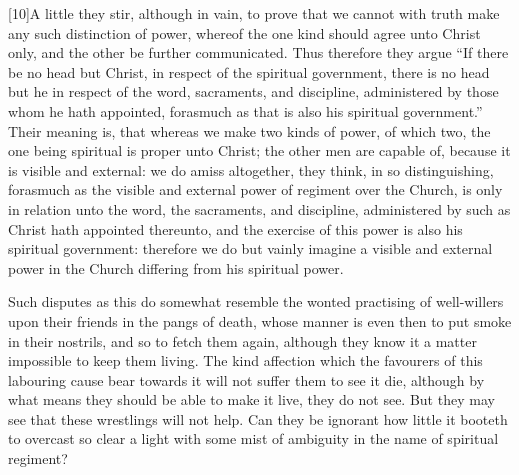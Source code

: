 [10]A little they stir, although in vain, to prove that we cannot with truth make any such distinction of power, whereof the one kind should agree unto Christ only, and the other be further communicated. Thus therefore they argue “If there be no head but Christ, in respect of the spiritual government, there is no head but he in respect of the word, sacraments, and discipline, administered by those whom he hath appointed, forasmuch as that is also his spiritual government.” Their meaning is, that whereas we make two kinds of power, of which two, the one being spiritual is proper unto Christ; the other men are capable of, because it is visible and external: we do amiss altogether, they think, in so distinguishing, forasmuch as the visible and external power of regiment over the Church, is only in relation unto the word, the sacraments, and discipline, administered by such as Christ hath appointed thereunto, and the exercise of this power is also his spiritual government: therefore we do but vainly imagine a visible and external power in the Church differing from his spiritual power.

Such disputes as this do somewhat resemble the wonted practising of well-willers upon their friends in the pangs of death, whose manner is even then to put smoke in their nostrils, and so to fetch them again, although they know it a matter impossible to keep them living. The kind affection which the favourers of this labouring cause bear towards it will  not suffer them to see it die, although by what means they should be able to make it live, they do not see. But they may see that these wrestlings will not help. Can they be ignorant how little it booteth to overcast so clear a light with some mist of ambiguity in the name of spiritual regiment?

